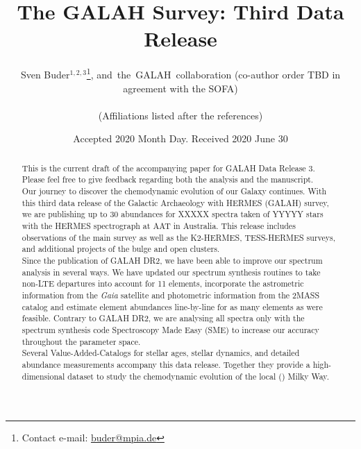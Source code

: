 \documentclass[fleqn,usenatbib,useAMS]{mnras}
\newcommand{\Gaia}{\textit{Gaia}\xspace}
\begin{document}
\begin{CJK*}{UTF8}{gbsn}
\label{firstpage}
\pagerange{\pageref{firstpage}--\pageref{lastpage}}


\title{The GALAH Survey: Third Data Release}

\author[Buder et al.]{Sven Buder$^{1,2,3}$\thanks{Contact e-mail: \href{mailto:buder@mpia.de}{buder@mpia.de}},
and~the~GALAH~collaboration \newauthor
(co-author order TBD in agreement with the SOFA)
\\
\\
(Affiliations listed after the references)}

\date{Accepted 2020 Month Day. Received 2020 June 30}


\maketitle
\end{CJK*}

\begin{abstract}
This is the current draft of the accompanying paper for GALAH Data Release 3. \\
Please feel free to give feedback regarding both the analysis and the manuscript. \\
Our journey to discover the chemodynamic evolution of our Galaxy continues. With this third data release of the Galactic Archaeology with HERMES (GALAH) survey, we are publishing up to 30 abundances for XXXXX spectra taken of YYYYY stars with the HERMES spectrograph at AAT in Australia. This release includes observations of the main survey as well as the K2-HERMES, TESS-HERMES surveys, and additional projects of the bulge and open clusters. \\
Since the publication of GALAH DR2, we have been able to improve our spectrum analysis in several ways. We have updated our spectrum synthesis routines to take non-LTE departures into account for 11 elements, incorporate the astrometric information from the \Gaia satellite and photometric information from the 2MASS catalog and estimate element abundances line-by-line for as many elements as were feasible. Contrary to GALAH DR2, we are analysing all spectra only with the spectrum synthesis code Spectroscopy Made Easy (SME) to increase our accuracy throughout the parameter space. \\
Several Value-Added-Catalogs for stellar ages, stellar dynamics, and detailed abundance measurements accompany this data release. Together they provide a high-dimensional dataset to study the chemodynamic evolution of the local () Milky Way.
%
\end{abstract}
\end{document}
